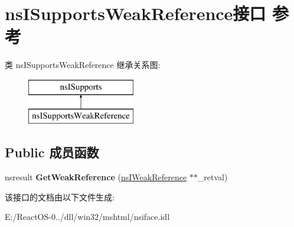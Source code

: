 \hypertarget{interfacens_i_supports_weak_reference}{}\section{ns\+I\+Supports\+Weak\+Reference接口 参考}
\label{interfacens_i_supports_weak_reference}
类 ns\+I\+Supports\+Weak\+Reference 继承关系图\+:\begin{figure}[H]
\begin{center}
\leavevmode
\includegraphics[height=2.000000cm]{interfacens_i_supports_weak_reference}
\end{center}
\end{figure}
\subsection*{Public 成员函数}
\begin{DoxyCompactItemize}
\item 
\mbox{\label{interfacens_i_supports_weak_reference_a4f668ce86f4a7f946a434f669bd56fd8}} 
nsresult {\bfseries Get\+Weak\+Reference} (\hyperlink{interfacens_i_weak_reference}{ns\+I\+Weak\+Reference} $\ast$$\ast$\+\_\+retval)
\end{DoxyCompactItemize}


该接口的文档由以下文件生成\+:\begin{DoxyCompactItemize}
\item 
E\+:/\+React\+O\+S-\/0../dll/win32/mshtml/nsiface.\+idl\end{DoxyCompactItemize}
